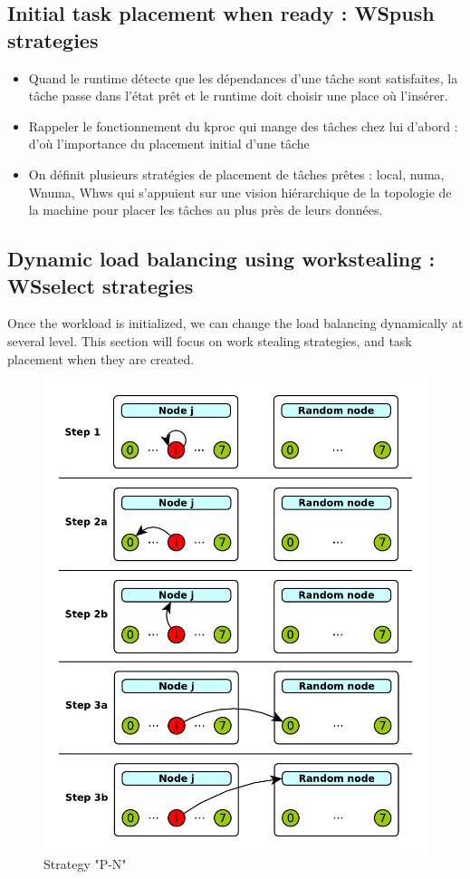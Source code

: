 \documentclass{Styles/llncs}
\begin{document}
\subsection{Initial task placement when ready : WSpush strategies}
\begin{itemize}
  \item Quand le runtime détecte que les dépendances d'une tâche sont
    satisfaites, la tâche passe dans l'état prêt et le runtime doit
    choisir une place où l'insérer.
  \item Rappeler le fonctionnement du kproc qui mange des tâches chez
    lui d'abord : d'où l'importance du placement initial d'une tâche
  \item On définit plusieurs stratégies de placement de tâches prêtes
    : local, numa, Wnuma, Whws qui s'appuient sur une vision hiérarchique de
    la topologie de la machine pour placer les tâches au plus près de
    leurs données.
\end{itemize}

\subsection{Dynamic load balancing using workstealing : WSselect strategies}

Once the workload is initialized, we can change the load balancing dynamically
at several level. This section will focus on work stealing strategies, and
task placement when they are created.

\begin{figure}[t]
  \centering
  \includegraphics[scale=0.8]{figures/strategies.pdf}
\caption{Strategy "P-N"}
\label{fig:detail-strategy}
\end{figure}
\end{document}
